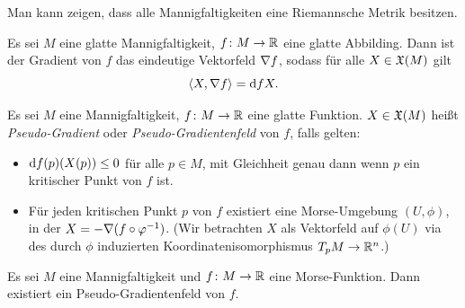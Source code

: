\begin{remark}
    Man kann zeigen, dass alle Mannigfaltigkeiten eine Riemannsche Metrik besitzen.
\end{remark}

\begin{definition}[Gradient]
    \label{def: gradient}
    Es sei $M$ eine glatte Mannigfaltigkeit, $f \colon M \to { \mathbb R }$ eine glatte Abbilding. Dann 
    ist der Gradient von $f$ das eindeutige Vektorfeld ${ \nabla } f$, sodass für alle $X \in { \mathfrak{X} } (M)$
    gilt 
    \[ \langle X , { \nabla } f \rangle = { \operatorname{d} } f X . \]
\end{definition}

\begin{definition}
    \label{def: pseudo-gradient}
    Es sei $M$ eine Mannigfaltigkeit, $f \colon M \to { \mathbb R }$ eine glatte Funktion. $X \in { \mathfrak{X} } (M)$
    heißt \textit{Pseudo-Gradient} oder \textit{Pseudo-Gradientenfeld} von $f$, falls gelten:
    \begin{itemize}
        \item ${ \operatorname{d} } f (p) (X(p)) \leq 0$ für alle $p \in M$, mit Gleichheit genau dann wenn 
            $p$ ein kritischer Punkt von $f$ ist.
        \item Für jeden kritischen Punkt $p$ von $f$ existiert eine Morse-Umgebung 
            $(U, \phi)$, in der $X = - { \nabla } (f \circ \varphi^{-1})$.
            (Wir betrachten $X$ als Vektorfeld auf $\phi(U)$ via des durch $\phi$
            induzierten Koordinatenisomorphismus $T_pM \to { \mathbb R }^n$.)
    \end{itemize}
\end{definition}

\begin{prop}
    Es sei $M$ eine Mannigfaltigkeit und $f \colon M \to { \mathbb R }$ eine Morse-Funktion. 
    Dann existiert ein Pseudo-Gradientenfeld von $f$.
\end{prop}

